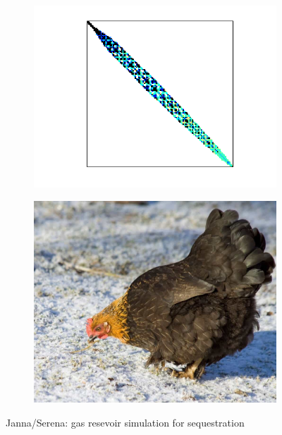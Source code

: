 \documentclass[t,12pt,numbers,fleqn]{beamer}
\begin{document}
\begin{frame}
\begin{figure}[h]
  \centering
  \begin{subfigure}[b]{0.5\textwidth}
    \centering
    \includegraphics[width=\textwidth,trim={2cm 1.5cm 2cm 1cm},clip]{figures/Serena}
  \end{subfigure}
  \begin{subfigure}[b]{0.4\textwidth}
    \centering
    \includegraphics[width=\textwidth]{figures/chicken}
  \end{subfigure}
  \caption*{Janna/Serena: gas resevoir simulation for 
    sequestration}
  \label{fig:Serena}
\end{figure}

\end{frame}

\end{document}
